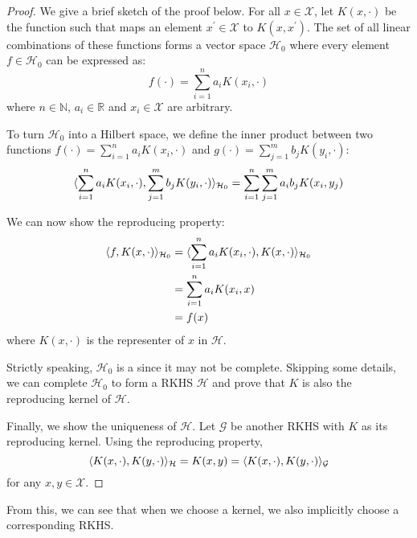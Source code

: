 \begin{proof}
We give a brief sketch of the proof below. For all $x \in \mathcal{X}$, let $K(x, \cdot)$ be the function such that maps an element $x^\prime \in \mathcal{X}$ to $K(x, x^\prime)$. The set of all linear combinations of these functions forms a vector space $\mathcal{H}_0$ where every element $f \in \mathcal{H}_0$ can be expressed as:
%
\begin{equation}
  f(\cdot) = \sum_{i=1}^n a_i K(x_i, \cdot)
\end{equation}
%
where $n \in \mathbb{N}$, $a_i \in \mathbb{R}$ and $x_i \in \mathcal{X}$ are arbitrary.

To turn $\mathcal{H}_0$ into a Hilbert space, we define the inner product between two functions $f(\cdot) = \sum_{i=1}^n a_i K(x_i, \cdot)$ and $g(\cdot) = \sum_{j=1}^m b_j K(y_i, \cdot)$:
%
\begin{equation}
  \langle\sum_{i=1}^n a_i K(x_i, \cdot), \sum_{j=1}^m b_j K(y_i, \cdot)\rangle_{\mathcal{H}_0} = \sum_{i=1}^n \sum_{j=1}^m a_i b_j K(x_i, y_j)
\end{equation}

We can now show the reproducing property:
%
\begin{align}
  \langle f, K(x, \cdot)\rangle_{\mathcal{H}_0} &= \langle\sum_{i=1}^n a_i K(x_i, \cdot), K(x, \cdot)\rangle_{\mathcal{H}_0} \\
                             &= \sum_{i=1}^n a_i K(x_i, x) \\
                             &= f(x)
\end{align}
%
where $K(x, \cdot)$ is the representer of $x$ in $\mathcal{H}$.

Strictly speaking, $\mathcal{H}_0$ is a  since it may not be complete. Skipping some details, we can complete $\mathcal{H}_0$ to form a RKHS $\mathcal{H}$ and prove that $K$ is also the reproducing kernel of $\mathcal{H}$.

Finally, we show the uniqueness of $\mathcal{H}$. Let $\mathcal{G}$ be another RKHS with $K$ as its reproducing kernel. Using the reproducing property,
%
\begin{equation}
	\langle K(x, \cdot), K(y, \cdot)\rangle_\mathcal{H} = K(x, y) = \langle K(x, \cdot), K(y, \cdot)\rangle_\mathcal{G}
\end{equation}
%
for any $x, y \in \mathcal{X}$. 
\end{proof}

From this, we can see that when we choose a kernel, we also implicitly choose a corresponding RKHS.

